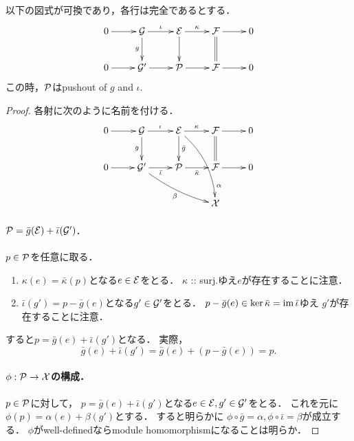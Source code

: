 \documentclass[a4paper]{jsarticle}
\begin{document}
    \begin{Lemma}\label{lemma:two_exact_seq_raise_po}
        以下の図式が可換であり，各行は完全であるとする．
        \[\vcenter{\xymatrix{
            0 \ar[r]& \shG \ar[d]_-{g}\ar[r]^-{\iota}& \shE \ar[d]\ar[r]^-{\kappa}& \shF \ar@{=}[d]\ar[r]& 0 \\
            0 \ar[r]& \shG' \ar[r]& \shP \ar[r]& \shF \ar[r]& 0
        }}\]
        この時，$\mathcal{P}$はpushout of $g$ and $\iota$.
    \end{Lemma}
    \begin{proof}
        各射に次のように名前を付ける．
        \[\vcenter{\xymatrix{
            0 \ar[r]& \shG \ar[d]_-{g}\ar[r]^-{\iota}& \shE
            \ar[d]^-{\bar{g}}\ar[r]^-{\kappa}\ar@/^10pt/[rdd]^(.8){\alpha}& \shF \ar@{=}[d]\ar[r]& 0 \\
            0 \ar[r]& \shG' \ar[r]_-{\bar{\iota}}\ar@/_5pt/[rrd]_-{\beta}& \shP \ar[r]_-{\bar{\kappa}}& \shF \ar[r]& 0 \\
            {} & {} & {} & \shX
        }}\]

        \paragraph{$\mathcal{P}=\bar{g}(\mathcal{E})+\bar{\iota}(\mathcal{G}')$.}
        $p \in \mathcal{P}$を任意に取る．
        \begin{enumerate}
            \item
                $\kappa(e)=\bar{\kappa}(p)$となる$e \in \mathcal{E}$をとる． 
                $\kappa$ :: surj.ゆえ$e$が存在することに注意．
            \item
                $\bar{\iota}(g')=p-\bar{g}(e)$となる$g' \in \mathcal{G}'$をとる． 
                $p-\bar{g}(e) \in \ker \bar{\kappa}=\operatorname{im} \bar{\iota}$ゆえ
                $g'$が存在することに注意．
        \end{enumerate}
        すると$p=\bar{g}(e)+\bar{\iota}(g')$となる．
        実際，
        \[ \bar{g}(e)+\bar{\iota}(g')=\bar{g}(e)+(p-\bar{g}(e))=p. \]

        \paragraph{$\phi: \mathcal{P} \to \mathcal{X}$の構成．}
        $p \in \mathcal{P}$に対して，
        $p=\bar{g}(e)+\bar{\iota}(g')$となる$e \in \mathcal{E}, g' \in \mathcal{G}'$をとる．
        これを元に$\phi(p)=\alpha(e)+\beta(g')$とする．
        すると明らかに
        $\phi \circ \bar{g}=\alpha, \phi \circ \bar{\iota}=\beta$が成立する．
        $\phi$がwell-definedならmodule homomorphismになることは明らか．
        

\end{proof}
\end{document}
